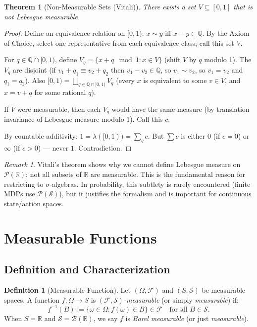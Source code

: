 \documentclass[11pt,a4paper]{article}
\theoremstyle{definition}
\newtheorem{definition}{Definition}[section]
\theoremstyle{plain}
\newtheorem{theorem}{Theorem}[section]
\theoremstyle{remark}
\newtheorem{remark}{Remark}[section]
\newcommand{\R}{\mathbb{R}}
\newcommand{\Q}{\mathbb{Q}}
\newcommand{\powerset}{\mathcal{P}}
\newcommand{\Borel}{\mathcal{B}}
\begin{document}
\begin{theorem}[Non-Measurable Sets (Vitali)]
\label{thm:vitali}
There exists a set $V \subseteq [0, 1]$ that is not Lebesgue measurable.
\end{theorem}

\begin{proof}
Define an equivalence relation on $[0,1)$: $x \sim y$ iff $x - y \in \Q$.
By the Axiom of Choice, select one representative from each equivalence class;
call this set $V$.

For $q \in \Q \cap [0, 1)$, define $V_q = \{x + q \mod 1 : x \in V\}$
(shift $V$ by $q$ modulo 1). The $V_q$ are disjoint (if $v_1 + q_1 \equiv v_2 + q_2$
then $v_1 - v_2 \in \Q$, so $v_1 \sim v_2$, so $v_1 = v_2$ and $q_1 = q_2$).
Also $[0, 1) = \bigsqcup_{q \in \Q \cap [0,1)} V_q$ (every $x$ is equivalent to
some $v \in V$, and $x = v + q$ for some rational $q$).

If $V$ were measurable, then each $V_q$ would have the same measure (by
translation invariance of Lebesgue measure modulo 1). Call this $c$.

By countable additivity: $1 = \lambda([0,1)) = \sum_{q} c$. But $\sum c$ is either
$0$ (if $c = 0$) or $\infty$ (if $c > 0$) --- never $1$. Contradiction.
\end{proof}

\begin{remark}
Vitali's theorem shows why we cannot define Lebesgue measure on $\powerset(\R)$:
not all subsets of $\R$ are measurable. This is the fundamental reason for
restricting to $\sigma$-algebras. In probability, this subtlety is rarely
encountered (finite MDPs use $\powerset(\mathcal{S})$), but it justifies
the formalism and is important for continuous state/action spaces.
\end{remark}

\section{Measurable Functions}
\label{sec:measurable}

\subsection{Definition and Characterization}
\label{subsec:meas_def}

\begin{definition}[Measurable Function]
\label{def:measurable_fn}
Let $(\Omega, \mathcal{F})$ and $(S, \mathcal{S})$ be measurable spaces. A function
$f: \Omega \to S$ is \emph{$(\mathcal{F}, \mathcal{S})$-measurable} (or simply
\emph{measurable}) if:
\begin{equation}
    f^{-1}(B) := \{\omega \in \Omega : f(\omega) \in B\} \in \mathcal{F} \quad \text{for all } B \in \mathcal{S}.
    \label{eq:measurable_fn}
\end{equation}
When $S = \R$ and $\mathcal{S} = \Borel(\R)$, we say $f$ is \emph{Borel measurable}
(or just \emph{measurable}).
\end{definition}
\end{document}

